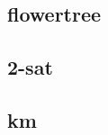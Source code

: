 \documentclass[10pt,a4paper]{article}
\begin{document}
\begin{spacing}{0.5}
		\subsection{flowertree}
			
		\subsection{2-sat}
			
		\subsection{km}
			

\end{spacing}
\end{document}
